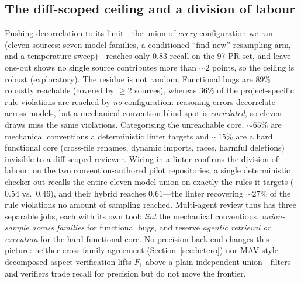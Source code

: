\documentclass[conference]{IEEEtran}
\begin{document}
\subsection{The diff-scoped ceiling and a division of labour}
\label{sec:ceiling}
Pushing decorrelation to its limit---the union of \emph{every} configuration we
ran (eleven sources: seven model families, a conditioned ``find-new'' resampling
arm, and a temperature sweep)---reaches only $0.83$ recall on the 97-PR set, and
leave-one-out shows no single source contributes more than ${\sim}2$ points, so the
ceiling is robust (exploratory). The residue is not random. Functional bugs are
$89\%$ robustly reachable (covered by ${\geq}2$ sources), whereas $36\%$ of the
project-specific rule violations are reached by \emph{no} configuration: reasoning
errors decorrelate across models, but a mechanical-convention blind spot is
\emph{correlated}, so eleven draws miss the same violations. Categorising the
unreachable core, ${\sim}65\%$ are mechanical conventions a deterministic linter
targets and ${\sim}15\%$ are a hard functional core (cross-file renames, dynamic
imports, races, harmful deletions) invisible to a diff-scoped reviewer. Wiring in a
linter confirms the division of labour: on the two convention-authored pilot
repositories, a single deterministic checker out-recalls the entire eleven-model
union on exactly the rules it targets ($0.54$ vs.\ $0.46$), and their hybrid reaches
$0.61$---the linter recovering ${\sim}27\%$ of the rule violations no amount of
sampling reached. Multi-agent review thus has three separable jobs, each with its
own tool: \emph{lint} the mechanical conventions, \emph{union-sample across
families} for functional bugs, and reserve \emph{agentic retrieval or execution} for
the hard functional core. No precision back-end changes this picture: neither
cross-family agreement (Section~\ref{sec:hetero}) nor MAV-style decomposed aspect
verification lifts $F_1$ above a plain independent union---filters and verifiers
trade recall for precision but do not move the frontier.
\end{document}

